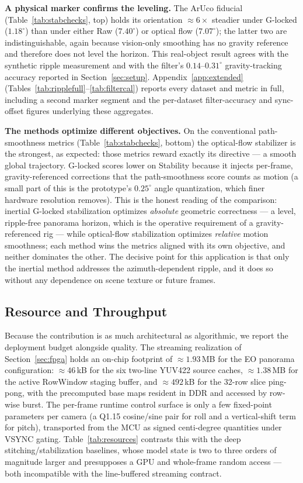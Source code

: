 \documentclass[journal]{IEEEtran}
\begin{document}
\textbf{A physical marker confirms the leveling.} The ArUco fiducial (Table~\ref{tab:stabchecks}, top) holds its orientation $\approx6\times$ steadier under G-locked ($1.18^\circ$) than under either Raw ($7.40^\circ$) or optical flow ($7.07^\circ$); the latter two are indistinguishable, again because vision-only smoothing has no gravity reference and therefore does not level the horizon. This real-object result agrees with the synthetic ripple measurement and with the filter's $0.14$--$0.31^\circ$ gravity-tracking accuracy reported in Section~\ref{sec:setup}. Appendix~\ref{app:extended} (Tables~\ref{tab:ripplefull}--\ref{tab:filtercal}) reports every dataset and metric in full, including a second marker segment and the per-dataset filter-accuracy and sync-offset figures underlying these aggregates.

\textbf{The methods optimize different objectives.} On the conventional path-smoothness metrics (Table~\ref{tab:stabchecks}, bottom) the optical-flow stabilizer is the strongest, as expected: those metrics reward exactly its directive --- a smooth global trajectory. G-locked scores lower on Stability because it injects per-frame, gravity-referenced corrections that the path-smoothness score counts as motion (a small part of this is the prototype's $0.25^\circ$ angle quantization, which finer hardware resolution removes). This is the honest reading of the comparison: inertial G-locked stabilization optimizes \emph{absolute} geometric correctness --- a level, ripple-free panorama horizon, which is the operative requirement of a gravity-referenced rig --- while optical-flow stabilization optimizes \emph{relative} motion smoothness; each method wins the metrics aligned with its own objective, and neither dominates the other. The decisive point for this application is that only the inertial method addresses the azimuth-dependent ripple, and it does so without any dependence on scene texture or future frames.

\subsection{Resource and Throughput}
\label{sec:resources}
Because the contribution is as much architectural as algorithmic, we report the deployment budget alongside quality. The streaming realization of Section~\ref{sec:fpga} holds an on-chip footprint of ${\approx}1.93$\,MB for the EO panorama configuration: ${\approx}46$\,kB for the six two-line YUV422 source caches, ${\approx}1.38$\,MB for the active RowWindow staging buffer, and ${\approx}492$\,kB for the 32-row slice ping-pong, with the precomputed base maps resident in DDR and accessed by row-wise burst. The per-frame runtime control surface is only a few fixed-point parameters per camera (a Q1.15 cosine/sine pair for roll and a vertical-shift term for pitch), transported from the MCU as signed centi-degree quantities under VSYNC gating. Table~\ref{tab:resources} contrasts this with the deep stitching/stabilization baselines, whose model state is two to three orders of magnitude larger and presupposes a GPU and whole-frame random access --- both incompatible with the line-buffered streaming contract.
\end{document}
